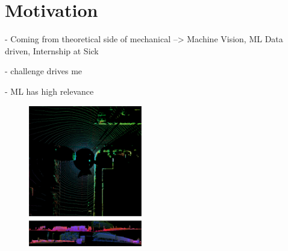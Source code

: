 


\setlength{\columnsep}{15pt}%
\setlength{\intextsep}{0pt plus 0pt minus 0pt}

\begin{minipage}[t]{504pt}
\begin{minipage}[t]{350pt}
\setlength{\parindent}{\myindent}
\setlength{\parskip}{\myparskip}

 \vspace*{-10pt}

\section{Motivation}
- Coming from theoretical side of mechanical --> Machine Vision, ML Data driven, Internship at Sick

- challenge drives me

- ML has high relevance

\end{minipage}
\hspace{13pt}\begin{minipage}[t]{140pt}
\begin{figure}[H]
\includegraphics[width=140pt]{pic/fusion.png}
\end{figure}
\end{minipage}
\end{minipage}



